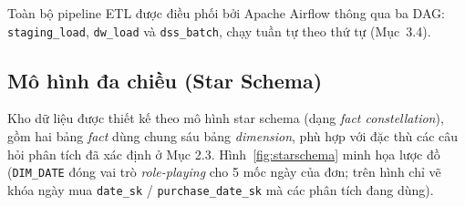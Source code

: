 Toàn bộ pipeline ETL được điều phối bởi Apache Airflow thông qua ba DAG:
\texttt{staging\_load}, \texttt{dw\_load} và \texttt{dss\_batch}, chạy tuần tự
theo thứ tự (Mục~3.4).

\subsection{Mô hình đa chiều (Star Schema)}
\hspace{1cm}
Kho dữ liệu được thiết kế theo mô hình star schema (dạng \textit{fact constellation}),
gồm hai bảng \textit{fact} dùng chung sáu bảng \textit{dimension}, phù hợp với đặc thù các câu
hỏi phân tích đã xác định ở Mục 2.3. Hình~\ref{fig:starschema} minh họa lược đồ (\texttt{DIM\_DATE} đóng
vai trò \textit{role-playing} cho 5 mốc ngày của đơn; trên hình chỉ vẽ khóa ngày mua
\texttt{date\_sk} / \texttt{purchase\_date\_sk} mà các phân tích đang dùng).

